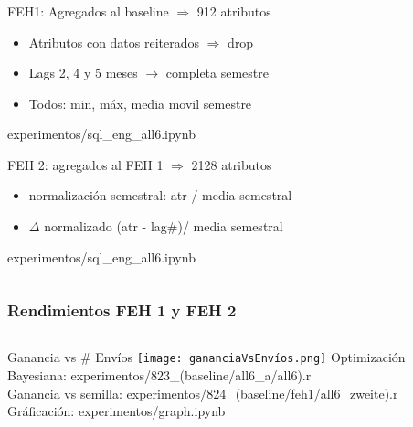 \documentclass[aspectratio=169]{beamer} %
\begin{document}
\begin{frame}
  \frametitle{}
  \begin{columns}[onlytextwidth]
    \begin{column}{.6\textwidth}
     \begin{block}{FEH1: Agregados al baseline $\Rightarrow$ 912 atributos}
        \begin{itemize}
          \item Atributos con datos reiterados $\Rightarrow$ drop
          \item Lags 2, 4 y 5 meses $\rightarrow$ completa semestre
          \item Todos: min, máx, media movil semestre
	    \end{itemize}
        {\tiny experimentos/sql\_eng\_all6.ipynb}
      \end{block}
      \begin{block}{FEH 2: agregados al FEH 1 $\Rightarrow$ 2128 atributos}
        \begin{itemize}
          \item normalización semestral: atr / media semestral
          \item $\Delta$ normalizado (atr - lag\#)/ media semestral
		    \end{itemize}
        {\tiny experimentos/sql\_eng\_all6.ipynb}
      \end{block}
    \end{column}
  \end{columns}
\end{frame}


\begin{frame}
  \frametitle{Rendimientos FEH 1 y FEH 2}
  \begin{columns}[onlytextwidth]
    \begin{column}{.6\textwidth}
      \begin{block}{Ganancia vs \# Envíos}
        \texttt{[image: gananciaVsEnvíos.png]}
        {\tiny Optimización Bayesiana: experimentos/823\_(baseline/all6\_a/all6).r\\
        Ganancia vs semilla: experimentos/824\_(baseline/feh1/all6\_zweite).r\\ Gráficación: experimentos/graph.ipynb\\
        }
      \end{block}
    \end{column}
  \end{columns}      
\end{frame}
\end{document}
